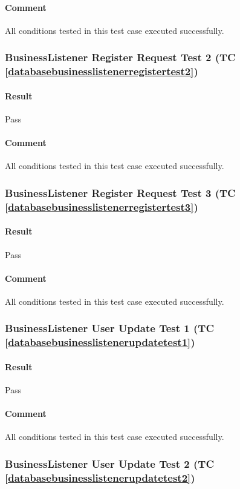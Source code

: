\documentclass[hidelinks,english]{article}
\begin{document}
				\paragraph{Comment} All conditions tested in this test case executed successfully.
				
			\subsubsection{BusinessListener Register Request Test 2 (TC \ref{databasebusinesslistenerregistertest2})}
				\paragraph{Result} Pass
				\paragraph{Comment} All conditions tested in this test case executed successfully.
				
			\subsubsection{BusinessListener Register Request Test 3 (TC \ref{databasebusinesslistenerregistertest3})}
				\paragraph{Result} Pass
				\paragraph{Comment} All conditions tested in this test case executed successfully.
				
			\subsubsection{BusinessListener User Update Test 1 (TC \ref{databasebusinesslistenerupdatetest1})}
				\paragraph{Result} Pass
				\paragraph{Comment} All conditions tested in this test case executed successfully.
				
			\subsubsection{BusinessListener User Update Test 2 (TC \ref{databasebusinesslistenerupdatetest2})}
\end{document}
